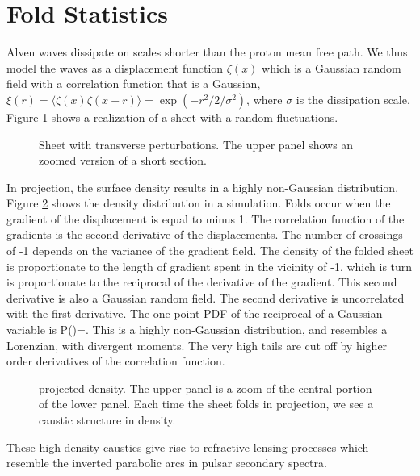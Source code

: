 \documentclass[useAMS,usenatbib]{mn2e}
\begin{document}
\section{Fold Statistics}

Alven waves dissipate on scales shorter than the proton mean free
path.  We thus model the waves as a displacement function $\zeta(x)$
which is a Gaussian random field with a correlation function that is a
Gaussian, $\xi(r)=\langle \zeta(x)
\zeta(x+r)\rangle=\exp(-r^2/2/\sigma^2)$, where $\sigma$ is the
dissipation scale.  Figure \ref{fig:sheet} shows a realization of a
sheet with a random fluctuations.

\begin{figure}
\centerline{}
\caption{Sheet with transverse perturbations.  The upper panel shows
  an zoomed version of a short section.}
\label{fig:sheet}
\end{figure}

In projection, the surface density results in a highly non-Gaussian
distribution. Figure \ref{fig:rho} shows the density distribution in a
simulation.  Folds occur when the gradient of the displacement is
equal to minus 1.  The correlation function of the gradients is the
second derivative of the displacements.  The number of crossings of -1
depends on the variance of the gradient field.  The density of the
folded sheet is proportionate to the length of gradient spent in the
vicinity of -1, which is turn is proportionate to the reciprocal of
the derivative of the gradient.  This second derivative is also a
Gaussian random field.  The second derivative is uncorrelated with the
first derivative.  The one point PDF of the reciprocal of a Gaussian
variable is
\beq
P(\rho)=.
\eeq
This is a highly non-Gaussian distribution, and resembles a Lorenzian,
with divergent moments.  The very
high tails are 
cut off by higher order derivatives of the correlation function.

\begin{figure}
\centerline{}
\caption{projected density.  The upper panel is a zoom of the central
  portion of the lower panel. Each time the sheet folds in projection,
we see a caustic structure in density.}
\label{fig:rho}
\end{figure}

These high density caustics give rise to refractive lensing processes
which resemble the inverted parabolic arcs in pulsar secondary
spectra.
\end{document}
